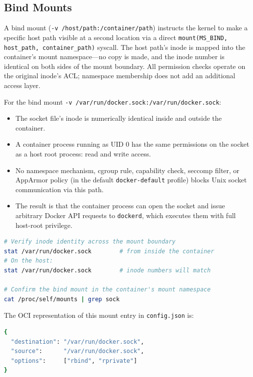 \subsection{Bind Mounts}

A bind mount (\texttt{-v /host/path:/container/path}) instructs the kernel to make a
specific host path visible at a second location via a direct \texttt{mount(MS\_BIND,
host\_path, container\_path)} syscall. The host path's inode is mapped into the
container's mount namespace---no copy is made, and the inode number is identical on
both sides of the mount boundary. All permission checks operate on the original
inode's ACL; namespace membership does not add an additional access layer.

For the bind mount \texttt{-v /var/run/docker.sock:/var/run/docker.sock}:

\begin{itemize}
    \item The socket file's inode is numerically identical inside and outside the
          container.
    \item A container process running as UID 0 has the same permissions on the socket
          as a host root process: read and write access.
    \item No namespace mechanism, cgroup rule, capability check, seccomp filter, or
          AppArmor policy (in the default \texttt{docker-default} profile) blocks
          Unix socket communication via this path.
    \item The result is that the container process can open the socket and issue
          arbitrary Docker API requests to \texttt{dockerd}, which executes them with
          full host-root privilege.
\end{itemize}

\begin{lstlisting}[language=bash]
# Verify inode identity across the mount boundary
stat /var/run/docker.sock        # from inside the container
# On the host:
stat /var/run/docker.sock        # inode numbers will match

# Confirm the bind mount in the container's mount namespace
cat /proc/self/mounts | grep sock
\end{lstlisting}

The OCI representation of this mount entry in \texttt{config.json} is:

\begin{lstlisting}[language=bash]
{
  "destination": "/var/run/docker.sock",
  "source":      "/var/run/docker.sock",
  "options":     ["rbind", "rprivate"]
}
\end{lstlisting}

